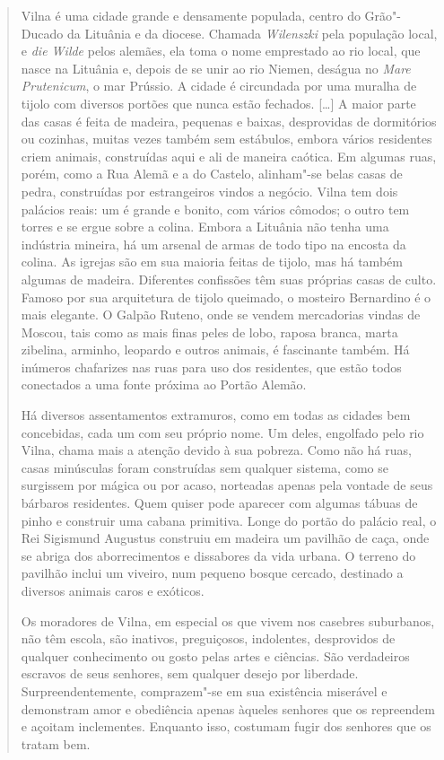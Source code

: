 \begin{quote}
Vilna é uma cidade grande e densamente populada, centro do Grão"-Ducado
da Lituânia e da diocese. Chamada \textit{Wilenszki} pela população local,
e \textit{die Wilde} pelos alemães, ela toma o nome emprestado ao rio
local, que nasce na Lituânia e, depois de se unir ao rio Niemen, deságua
no \textit{Mare Prutenicum}, o mar Prússio. A cidade é circundada por uma
muralha de tijolo com diversos portões que nunca estão fechados.
[\ldots{}] A maior parte das casas é feita de madeira, pequenas e baixas,
desprovidas de dormitórios ou cozinhas, muitas vezes também sem
estábulos, embora vários residentes criem animais, construídas aqui e
ali de maneira caótica. Em algumas ruas, porém, como a Rua Alemã e a do
Castelo, alinham"-se belas casas de pedra, construídas por estrangeiros
vindos a negócio. Vilna tem dois palácios reais: um é grande e bonito,
com vários cômodos; o outro tem torres e se ergue sobre a colina. Embora
a Lituânia não tenha uma indústria mineira, há um arsenal de armas de
todo tipo na encosta da colina. As igrejas são em sua maioria feitas de
tijolo, mas há também algumas de madeira. Diferentes confissões têm suas
próprias casas de culto. Famoso por sua arquitetura de tijolo queimado,
o mosteiro Bernardino é o mais elegante. O Galpão Ruteno, onde se vendem
mercadorias vindas de Moscou, tais como as mais finas peles de lobo,
raposa branca, marta zibelina, arminho, leopardo e outros animais, é
fascinante também. Há inúmeros chafarizes nas ruas para uso dos
residentes, que estão todos conectados a uma fonte próxima ao Portão
Alemão.

Há diversos assentamentos extramuros, como em todas as cidades bem
concebidas, cada um com seu próprio nome. Um deles, engolfado pelo rio
Vilna, chama mais a atenção devido à sua pobreza. Como não há ruas,
casas minúsculas foram construídas sem qualquer sistema, como se
surgissem por mágica ou por acaso, norteadas apenas pela vontade de seus
bárbaros residentes. Quem quiser pode aparecer com algumas tábuas de
pinho e construir uma cabana primitiva. Longe do portão do palácio real,
o Rei Sigismund Augustus construiu em madeira um pavilhão de caça, onde
se abriga dos aborrecimentos e dissabores da vida urbana. O terreno do
pavilhão inclui um viveiro, num pequeno bosque cercado, destinado a
diversos animais caros e exóticos.

Os moradores de Vilna, em especial os que vivem nos casebres suburbanos,
não têm escola, são inativos, preguiçosos, indolentes, desprovidos de
qualquer conhecimento ou gosto pelas artes e ciências. São verdadeiros
escravos de seus senhores, sem qualquer desejo por liberdade.
Surpreendentemente, comprazem"-se em sua existência miserável e
demonstram amor e obediência apenas àqueles senhores que os repreendem e
açoitam inclementes. Enquanto isso, costumam fugir dos senhores que os
tratam bem.


\end{quote}
